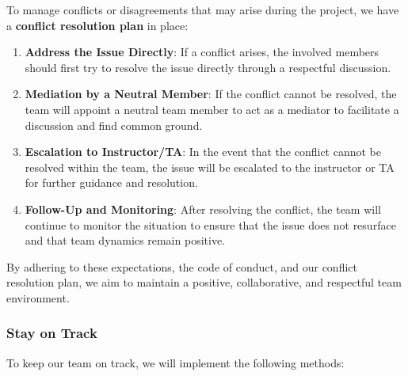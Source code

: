 \documentclass{article}
\begin{document}
\noindent
To manage conflicts or disagreements that may arise during the
project, we have a \textbf{conflict resolution plan} in place:

\begin{enumerate}
  \item \textbf{Address the Issue Directly}: If a conflict arises,
    the involved members should first try to resolve the issue
    directly through a respectful discussion.
  \item \textbf{Mediation by a Neutral Member}: If the conflict
    cannot be resolved, the team will appoint a neutral team member
    to act as a mediator to facilitate a discussion and find common ground.
  \item \textbf{Escalation to Instructor/TA}: In the event that the
    conflict cannot be resolved within the team, the issue will be
    escalated to the instructor or TA for further guidance and resolution.
  \item \textbf{Follow-Up and Monitoring}: After resolving the
    conflict, the team will continue to monitor the situation to
    ensure that the issue does not resurface and that team dynamics
    remain positive.
\end{enumerate}

By adhering to these expectations, the code of conduct, and our
conflict resolution plan, we aim to maintain a positive,
collaborative, and respectful team environment.

\subsubsection*{\color{blue}Stay on Track}

To keep our team on track, we will implement the following methods:
\end{document}

